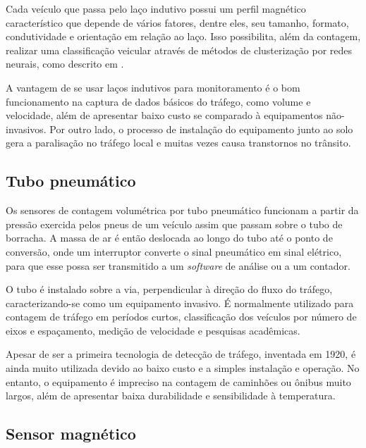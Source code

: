 Cada veículo que passa pelo laço indutivo possui um perfil magnético característico que depende de vários fatores, dentre eles, seu tamanho, formato, condutividade e orientação em relação ao laço. Isso possibilita, além da contagem, realizar uma classificação veicular através de métodos de clusterização por redes neurais, como descrito em \citep{almeida:2010:masther}.

A vantagem de se usar laços indutivos para monitoramento é o bom funcionamento na captura de dados básicos do tráfego, como volume e velocidade, além de apresentar baixo custo se comparado à equipamentos não-invasivos. Por outro lado, o processo de instalação do equipamento junto ao solo gera a paralisação no tráfego local e muitas vezes causa transtornos no trânsito.


\subsection{Tubo pneumático} %
\label{sub:tubo_pneum_tico}

Os sensores de contagem volumétrica por tubo pneumático funcionam a partir da pressão exercida pelos pneus de um veículo assim que passam sobre o tubo de borracha. A massa de ar é então deslocada ao longo do tubo até o ponto de conversão, onde um interruptor converte o sinal pneumático em sinal elétrico, para que esse possa ser transmitido a um \textit{software} de análise ou a um contador.

O tubo é instalado sobre a via, perpendicular à direção do fluxo do tráfego, caracterizando-se como um equipamento invasivo. É normalmente utilizado para contagem de tráfego em períodos curtos, classificação dos veículos por número de eixos e espaçamento, medição de velocidade e pesquisas acadêmicas.

Apesar de ser a primeira tecnologia de detecção de tráfego, inventada em 1920, é ainda muito utilizada devido ao baixo custo e a simples instalação e operação. No entanto, o equipamento é impreciso na contagem de caminhões ou ônibus muito largos, além de apresentar baixa durabilidade e sensibilidade à temperatura.


\subsection{Sensor magnético} %
\label{sub:sensores_magn_ticos}


